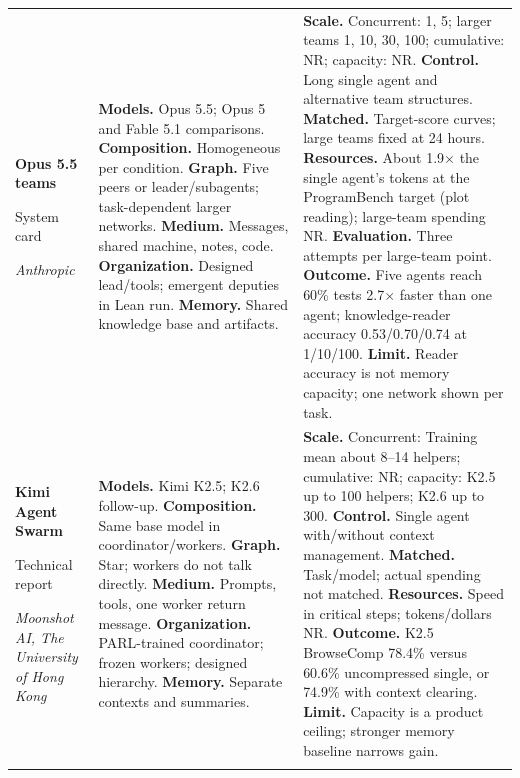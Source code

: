 \begin{longtable}{@{}>{\raggedright\arraybackslash}p{}>{\raggedright\arraybackslash}p{}>{\raggedright\arraybackslash}p{}@{}}
\textbf{Opus 5.5 teams}\par \citep{opus55-card}\par System card\par\emph{Anthropic} & \textbf{Models.} Opus 5.5; Opus 5 and Fable 5.1 comparisons. \textbf{Composition.} Homogeneous per condition. \textbf{Graph.} Five peers or leader/subagents; task-dependent larger networks. \textbf{Medium.} Messages, shared machine, notes, code. \textbf{Organization.} Designed lead/tools; emergent deputies in Lean run. \textbf{Memory.} Shared knowledge base and artifacts. & \textbf{Scale.} Concurrent: 1, 5; larger teams 1, 10, 30, 100; cumulative: NR; capacity: NR. \textbf{Control.} Long single agent and alternative team structures. \textbf{Matched.} Target-score curves; large teams fixed at 24 hours. \textbf{Resources.} About 1.9$\times$ the single agent's tokens at the ProgramBench target (plot reading); large-team spending NR. \textbf{Evaluation.} Three attempts per large-team point. \textbf{Outcome.} Five agents reach 60\% tests 2.7$\times$ faster than one agent; knowledge-reader accuracy 0.53/0.70/0.74 at 1/10/100. \textbf{Limit.} Reader accuracy is not memory capacity; one network shown per task. \\ \addlinespace[5pt]
\textbf{Kimi Agent Swarm}\par \citep{kimi-agent-swarm}\par Technical report\par\emph{Moonshot AI, The University of Hong Kong} & \textbf{Models.} Kimi K2.5; K2.6 follow-up. \textbf{Composition.} Same base model in coordinator/workers. \textbf{Graph.} Star; workers do not talk directly. \textbf{Medium.} Prompts, tools, one worker return message. \textbf{Organization.} PARL-trained coordinator; frozen workers; designed hierarchy. \textbf{Memory.} Separate contexts and summaries. & \textbf{Scale.} Concurrent: Training mean about 8--14 helpers; cumulative: NR; capacity: K2.5 up to 100 helpers; K2.6 up to 300. \textbf{Control.} Single agent with/without context management. \textbf{Matched.} Task/model; actual spending not matched. \textbf{Resources.} Speed in critical steps; tokens/dollars NR. \textbf{Outcome.} K2.5 BrowseComp 78.4\% versus 60.6\% uncompressed single, or 74.9\% with context clearing. \textbf{Limit.} Capacity is a product ceiling; stronger memory baseline narrows gain. \\ \addlinespace[5pt]

\end{longtable}
